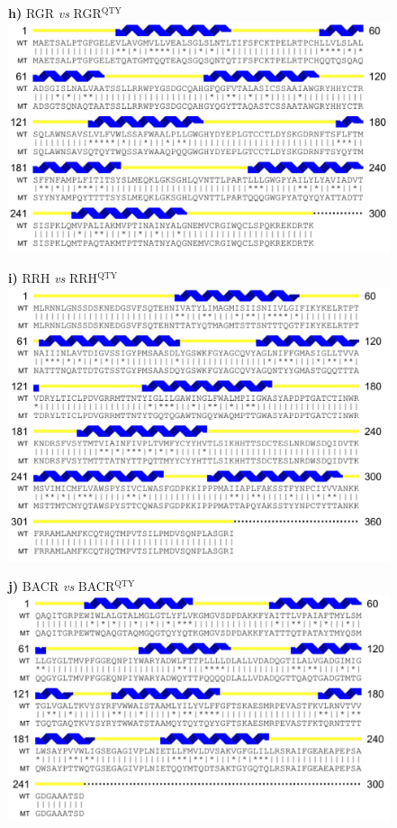 \documentclass[fleqn,12pt]{supp}
\begin{document}
\newpage
\begin{figure}[H]
    \textbf{h)} RGR \textit{vs} RGR$^{\textrm{QTY}}$ \\
    \includegraphics[width=\linewidth]{FigureS1h.jpg}
\end{figure}

\newpage
\begin{figure}[H]
    \textbf{i)} RRH \textit{vs} RRH$^{\textrm{QTY}}$ \\
    \includegraphics[width=\linewidth]{FigureS1i.jpg}
\end{figure}

\newpage
\begin{figure}[H]
    \textbf{j)} BACR \textit{vs} BACR$^{\textrm{QTY}}$ \\
    \includegraphics[width=\linewidth]{FigureS1j.jpg}
\end{figure}
\end{document}
